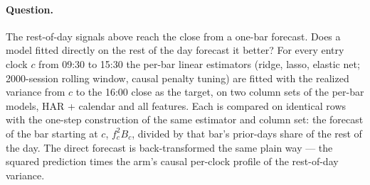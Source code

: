\paragraph{Question.} The rest-of-day signals above reach the close from a
one-bar forecast. Does a model fitted directly on the rest of the day forecast
it better? For every entry clock $c$ from 09:30 to 15:30 the per-bar linear
estimators (ridge, lasso, elastic net; 2000-session rolling window, causal
penalty tuning) are fitted with the realized variance from $c$ to the 16:00
close as the target, on two column sets of the per-bar models, HAR + calendar
and all features. Each is
compared on identical rows with the one-step construction of the same
estimator and column set: the forecast of the bar starting at $c$, $f_c^2B_c$,
divided by that bar's prior-days share of the rest of the day. The direct
forecast is back-transformed the same plain way --- the squared prediction
times the arm's causal per-clock profile of the rest-of-day variance.

\begin{table}[H]
\centering
\caption{Direct rest-of-day forecasts against the one-step construction,
\runappRdNlo{}--\runappRdNhi{} sessions from \runappRdFirst{} to
\runappRdLast{}. $\Delta$QLIKE is $100\,(\mathrm{QLIKE}_{\text{direct}}/
\mathrm{QLIKE}_{\text{one-step}}-1)$ at one entry clock; the median is over
the twelve clocks 09:30--15:00. Clocks better (worse) count the clocks at
which the direct forecast's loss is lower (higher) with a Diebold--Mariano
$p$ below \runappRdAlpha{}; clocks higher counts point estimates above zero.
At 15:30 the two constructions are the same forecast.}
\label{tab:app_run_restofday}
\runappfit{\small}
\end{table}

